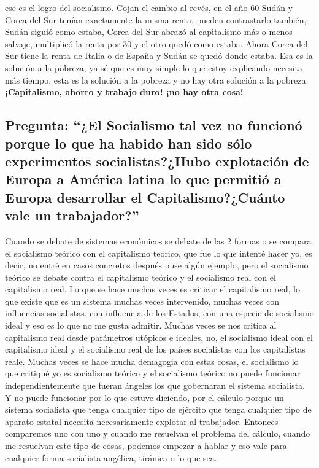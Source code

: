 ese es el logro del socialismo. Cojan el cambio al revés, en el año 60 Sudán y Corea del Sur tenían exactamente la misma renta, pueden contrastarlo también, Sudán siguió como estaba, Corea del Sur abrazó al capitalismo más o menos salvaje, multiplicó la renta por 30 y el otro quedó como estaba. Ahora Corea del Sur tiene la renta de Italia o de España y Sudán se quedó donde estaba. Esa es la solución a la pobreza, ya sé que es muy simple lo que estoy explicando necesita más tiempo, esta es la solución a la pobreza y no hay otra solución a la pobreza: \textbf{¡Capitalismo, ahorro y trabajo duro! ¡no hay otra cosa!}

\subsection{Pregunta: \enquote{¿El Socialismo tal vez no funcionó porque lo que ha habido han sido sólo experimentos socialistas?¿Hubo explotación de Europa a América latina lo que permitió a Europa desarrollar el Capitalismo?¿Cuánto vale un trabajador?}}

Cuando se debate de sistemas económicos se debate de las 2 formas o se compara el socialismo teórico con el capitalismo teórico, que fue lo que intenté hacer yo, es decir, no entré en casos concretos después puse algún ejemplo, pero el socialismo teórico se debate contra el capitalismo teórico y el socialismo real con el capitalismo real. Lo que se hace muchas veces es criticar el capitalismo real, lo que existe que es un sistema muchas veces intervenido, muchas veces con influencias socialistas, con influencia de los Estados, con una especie de socialismo ideal y eso es lo que no me gusta admitir. Muchas veces se nos critica al capitalismo real desde parámetros utópicos e ideales, no, el socialismo ideal con el capitalismo ideal y el socialismo real de los países socialistas con los capitalistas reale. Muchas veces se hace mucha demagogia con estas cosas, el socialismo lo que critiqué yo es socialismo teórico y el socialismo teórico no puede funcionar independientemente que fueran ángeles los que gobernaran el sistema socialista. Y no puede funcionar por lo que estuve diciendo, por el cálculo porque un sistema socialista que tenga cualquier tipo de ejército que tenga cualquier tipo de aparato estatal necesita necesariamente explotar al trabajador. Entonces comparemos uno con uno y cuando me resuelvan el problema del cálculo, cuando me resuelvan este tipo de cosas, podemos empezar a hablar y eso vale para cualquier forma socialista angélica, tiránica o lo que sea.

